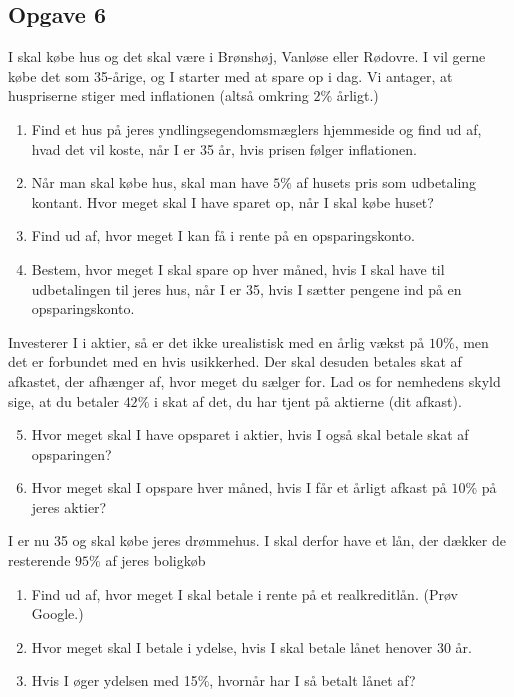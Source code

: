 \subsection*{Opgave 6}
I skal købe hus og det skal være i Brønshøj, Vanløse eller Rødovre. I vil gerne købe det som 35-årige, og I starter med at spare op i dag. Vi antager, at huspriserne stiger med inflationen (altså omkring $2\%$ årligt.)
\begin{enumerate}[label=\roman*)]
	\item Find et hus på jeres yndlingsegendomsmæglers hjemmeside og find ud af, hvad det vil koste,
	 når I er 35 år, hvis prisen følger inflationen. 
	\item Når man skal købe hus, skal man have $5\%$ af husets pris som udbetaling kontant. Hvor meget skal 
	I have sparet op, når I skal købe huset?
	\item Find ud af, hvor meget I kan få i rente på en opsparingskonto.
	\item Bestem, hvor meget I skal spare op hver måned, hvis I skal have til udbetalingen til jeres hus, når I 
	er 35, hvis I sætter pengene ind på en opsparingskonto. 
\end{enumerate}
Investerer I i aktier, så er det ikke urealistisk med en årlig vækst på $10\%$, men det er forbundet med en hvis usikkerhed. Der skal desuden betales skat af afkastet, der afhænger af, hvor meget du sælger for. Lad os for nemhedens skyld sige, at du betaler $42\%$ i skat af det, du har tjent på aktierne (dit afkast). 
\begin{enumerate}[label=\roman*)]
	\setcounter{enumi}{4}
	\item Hvor meget skal I have opsparet i aktier, hvis I også skal betale skat af opsparingen?
	\item Hvor meget skal I opspare hver måned, hvis I får et årligt afkast på $10\%$ på jeres aktier?
\end{enumerate}
I er nu 35 og skal købe jeres drømmehus. I skal derfor have et lån, der dækker de resterende $95\%$ af jeres boligkøb
\begin{enumerate}[label=\roman*)]
	\item Find ud af, hvor meget I skal betale i rente på et realkreditlån. (Prøv Google.)
	\item Hvor meget skal I betale i ydelse, hvis I skal betale lånet henover 30 år. 
	\item Hvis I øger ydelsen med 15$\%$, hvornår har I så betalt lånet af?
\end{enumerate}